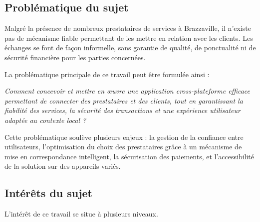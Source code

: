 \subsection{Problématique du sujet}

Malgré la présence de nombreux prestataires de services à Brazzaville, il n'existe pas de mécanisme fiable permettant de les mettre en relation avec les clients. Les échanges se font de façon informelle, sans garantie de qualité, de ponctualité ni de sécurité financière pour les parties concernées.

La problématique principale de ce travail peut être formulée ainsi :

\begin{center}
	\itshape
	Comment concevoir et mettre en \oe{}uvre une application cross-plateforme efficace permettant de connecter des prestataires et des clients, tout en garantissant la fiabilité des services, la sécurité des transactions et une expérience utilisateur adaptée au contexte local ?
\end{center}

Cette problématique soulève plusieurs enjeux : la gestion de la confiance entre utilisateurs, l'optimisation du choix des prestataires grâce à un mécanisme de mise en correspondance intelligent, la sécurisation des paiements, et l'accessibilité de la solution sur des appareils variés.

\subsection{Intérêts du sujet}

L'intérêt de ce travail se situe à plusieurs niveaux.

